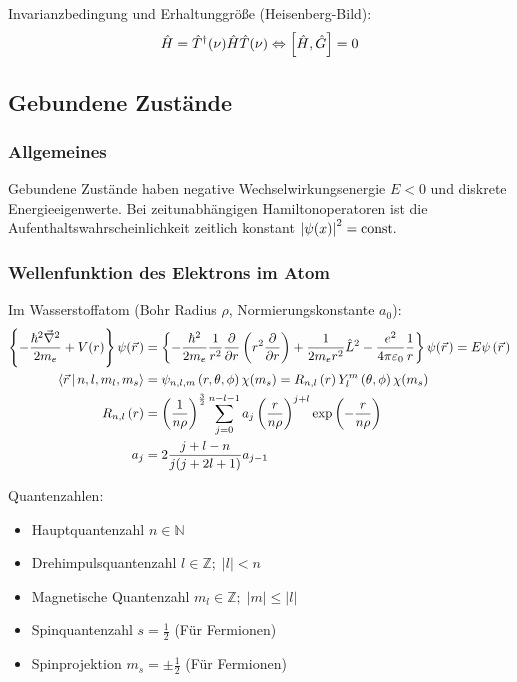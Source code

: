 			\noindent
			Invarianzbedingung und Erhaltunggröße (Heisenberg-Bild):
			\begin{equation}
				\hat{H} =\hat{T}^\dagger(\nu)\hat{H} \hat{T}(\nu) \Leftrightarrow \left[\hat{H},\hat{G}\right] = 0
			\end{equation}

	\subsection{Gebundene Zustände}
		\subsubsection{Allgemeines}
			\noindent
			Gebundene Zustände haben negative Wechselwirkungsenergie $E<0$ und diskrete Energieeigenwerte. Bei zeitunabhängigen Hamiltonoperatoren ist die Aufenthaltswahrscheinlichkeit zeitlich konstant $\left|\psi(x)\right|^2=\mathrm{const.}$

		\subsubsection{Wellenfunktion des Elektrons im Atom}
			\noindent
			Im Wasserstoffatom (Bohr Radius $\rho$, Normierungskonstante $a_0$):
			\begin{equation}
				\begin{aligned}
					\cBr{-\frac{\hbar^2 \Nabla^2}{2 m_e} + V(r)}\psi(\pvec{r})
					&= \cBr{-\frac{\hbar^2}{2 m_e}\frac{1}{r^2}\pder{}{r}\Br{r^2\pder{}{r}} + \frac{1}{2 m_e r^2} \hat{L}^2 - \frac{e^2}{4\pi\varepsilon_0}\frac{1}{r}}\psi(\pvec{r})
					= E \psi\Br{\pvec{r}}
					\\
					\Braket{\vec{r}|n,l,m_l,m_s} &= \psi_{n,l,m}\left(r,\theta,\phi\right)\chi(m_s)
					= R_{n,l}\left(r\right) Y_l^m\left(\theta,\phi\right)\chi(m_s) \\
					R_{n,l}\left(r\right)
					&= \left(\frac{1}{n\rho}\right)^{\frac{3}{2}}
					\sum_{j=0}^{n-l-1} a_j \left(\frac{r}{n\rho}\right)^{j+l} \exp\left({-\frac{r}{n\rho}}\right) \\
					a_j &= 2\frac{j+l-n}{j(j+2l+1)} a_{j-1} \\
				\end{aligned}
			\end{equation}

			\noindent
			Quantenzahlen:
			\begin{itemize}
				\item Hauptquantenzahl $n \in \mathbb{N}$
				\item Drehimpulsquantenzahl $l \in \mathbb{Z};\; \left|l\right| < n$
				\item Magnetische Quantenzahl $m_l \in \mathbb{Z};\; \left|m\right| \le \left|l\right|$
				\item Spinquantenzahl $s = \frac{1}{2}$ (Für Fermionen)
				\item Spinprojektion $m_s = \pm \frac{1}{2}$ (Für Fermionen)
			\end{itemize}

